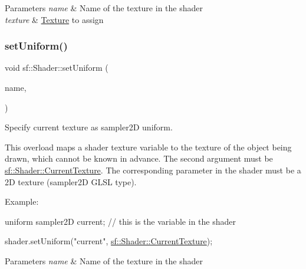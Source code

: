 \begin{DoxyParams}{Parameters}
{\em name} & Name of the texture in the shader \\
\hline
{\em texture} & \hyperlink{classsf_1_1_texture}{Texture} to assign \\
\hline
\end{DoxyParams}
\mbox{\label{classsf_1_1_shader_ab18f531e1f726b88fec1cf5a1e6af26d}} 
\subsubsection{\texorpdfstring{set\+Uniform()}{setUniform()}\hspace{0.1cm}{\footnotesize\ttfamily [16/16]}}
{\footnotesize\ttfamily void sf\+::\+Shader\+::set\+Uniform (\begin{DoxyParamCaption}\item[{const std\+::string \&}]{name,  }\item[{\hyperlink{structsf_1_1_shader_1_1_current_texture_type}{Current\+Texture\+Type}}]{ }\end{DoxyParamCaption})}



Specify current texture as {\ttfamily sampler2D} uniform. 

This overload maps a shader texture variable to the texture of the object being drawn, which cannot be known in advance. The second argument must be \hyperlink{classsf_1_1_shader_ac84c7953eec2e19358ea6e2cc5385b8d}{sf\+::\+Shader\+::\+Current\+Texture}. The corresponding parameter in the shader must be a 2D texture ({\ttfamily sampler2D} G\+L\+SL type).

Example\+: 
\begin{DoxyCode}
uniform sampler2D current; \textcolor{comment}{// this is the variable in the shader}
\end{DoxyCode}
 
\begin{DoxyCode}
shader.setUniform(\textcolor{stringliteral}{"current"}, \hyperlink{classsf_1_1_shader_ac84c7953eec2e19358ea6e2cc5385b8d}{sf::Shader::CurrentTexture});
\end{DoxyCode}



\begin{DoxyParams}{Parameters}
{\em name} & Name of the texture in the shader \\
\hline
\end{DoxyParams}
\mbox{\label{classsf_1_1_shader_a731d3b9953c50fe7d3fb03340b97deff}} 

